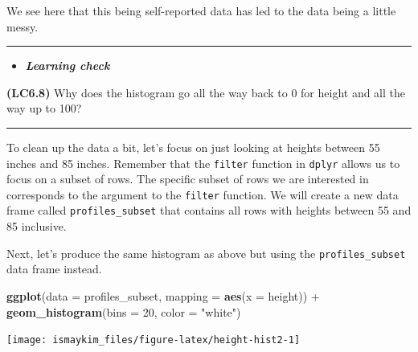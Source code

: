 \documentclass[]{tufte-book}
\newenvironment{Shaded}{\begin{snugshade}}{\end{snugshade}}
\newcommand{\KeywordTok}[1]{\textcolor[rgb]{0.13,0.29,0.53}{\textbf{{#1}}}}
\newcommand{\DataTypeTok}[1]{\textcolor[rgb]{0.13,0.29,0.53}{{#1}}}
\newcommand{\DecValTok}[1]{\textcolor[rgb]{0.00,0.00,0.81}{{#1}}}
\newcommand{\StringTok}[1]{\textcolor[rgb]{0.31,0.60,0.02}{{#1}}}
\newcommand{\NormalTok}[1]{{#1}}
\let\oldrule=\rule
\renewcommand{\rule}[1]{\oldrule{\linewidth}}
\newenvironment{rmdblock}[1]
  {\begin{shaded*}
  \begin{itemize}
  \renewcommand{\labelitemi}{
    \raisebox{-.7\height}[0pt][0pt]{
    }
  }
  \item
  }
  {
  \end{itemize}
  \end{shaded*}
  }
\newenvironment{learncheck}
  {\begin{rmdblock}{warning}}
  {\end{rmdblock}}
\theoremstyle{definition}
\theoremstyle{definition}
\theoremstyle{remark}
\begin{document}
We see here that this being self-reported data has led to the data being
a little messy.

\begin{center}\rule{0.5\linewidth}{\linethickness}\end{center}

\begin{learncheck}
\textbf{\emph{Learning check}}
\end{learncheck}

\textbf{(LC6.8)} Why does the histogram go all the way back to 0 for
height and all the way up to 100?

\begin{center}\rule{0.5\linewidth}{\linethickness}\end{center}

To clean up the data a bit, let's focus on just looking at heights
between 55 inches and 85 inches. Remember that the \texttt{filter}
function in \texttt{dplyr} allows us to focus on a subset of rows. The
specific subset of rows we are interested in corresponds to the argument
to the \texttt{filter} function. We will create a new data frame called
\texttt{profiles\_subset} that contains all rows with heights between 55
and 85 inclusive.

\begin{Shaded}
\end{Shaded}

Next, let's produce the same histogram as above but using the
\texttt{profiles\_subset} data frame instead.

\begin{Shaded}
\begin{Highlighting}[]
\KeywordTok{ggplot}\NormalTok{(}\DataTypeTok{data =} \NormalTok{profiles_subset, }\DataTypeTok{mapping =} \KeywordTok{aes}\NormalTok{(}\DataTypeTok{x =} \NormalTok{height)) +}
\StringTok{  }\KeywordTok{geom_histogram}\NormalTok{(}\DataTypeTok{bins =} \DecValTok{20}\NormalTok{, }\DataTypeTok{color =} \StringTok{"white"}\NormalTok{)}
\end{Highlighting}
\end{Shaded}

\begin{center}\texttt{[image: ismaykim\_files/figure-latex/height-hist2-1]} \end{center}
\end{document}
